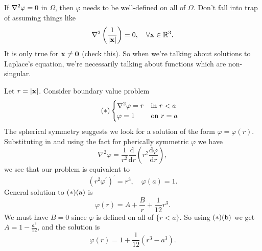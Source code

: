\begin{remark}
    If $ \laplacian \varphi=0 $ in $ \Omega $, then $ \varphi $ needs to be well-defined on all of $ \Omega $. Don't fall into trap of assuming things like
    \[
        \laplacian\left( \frac{1}{|\bfx|} \right)=0,\quad \forall \bfx\in \mathbb{R}^{3}.
    \]
    It is only true for ${\bf x}\neq \mathbf{0}$ (check this). So when we’re talking about solutions to Laplace’s equation, we’re necessarily talking about functions which are non-singular. 
\end{remark}

\begin{example}
    Let $ r=|{\bf x}| $. Consider boundary value problem 
    \[\tag{$*$}
        \begin{cases}
        \laplacian \varphi=r &\text{in }r<a\\
        \varphi=1 &\text{on }r=a\\
        \end{cases} 
    \]
    The spherical symmetry suggests we look for a solution of the form $ \varphi=\varphi(r) $. Substituting in and using the fact for pherically symmetric $ \varphi $ we have 
    \[
        \nabla^{2} \varphi=\frac{1}{r^{2}} \frac{\mathrm{d}}{\mathrm{d} r}\left(r^{2} \frac{\mathrm{d} \varphi}{\mathrm{d} r}\right),
    \]
    we see that our problem is equivalent to
    \[
        \left(r^{2} \varphi^{\prime}\right)^{\prime}=r^{3}, \quad \varphi(a)=1.
    \]
    General solution to $(*)(\mathrm{a})$ is 
    \[
        \varphi(r)=A+\frac{B}{r}+\frac{1}{12}r^3.
    \]
    We must have $B=0$ since $ \varphi $ is defined on all of $ \{r<a\} $. So using $ (*)(\mathrm{b}) $ we get $ A=1-\frac{a^3}{12} $, and the solution is 
    \[
        \varphi(r) = 1+\frac{1}{12}(r^3-a^3).
    \]
\end{example}

